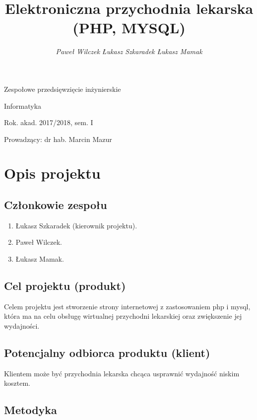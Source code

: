 \documentclass[a4paper]{article} \usepackage{polski} \usepackage[cp1250]{inputenc} \usepackage{url}
\title{\bf{Elektroniczna przychodnia lekarska (PHP, MYSQL)}} \author{{\em Paweł Wilczek }{\em Łukasz Szkaradek } {\em Łukasz Mamak}} \date{}
\begin{document}
\begin{titlepage} \maketitle \thispagestyle{empty} \bigskip \begin{center} Zespołowe przedsięwzięcie inżynierskie

Informatyka

Rok. akad. 2017/2018, sem. I

Prowadzący: dr hab. Marcin Mazur \end{center} \end{titlepage}

\tableofcontents \thispagestyle{empty}


\newpage

\section{Opis projektu}


\subsection{Członkowie zespołu}

\begin{enumerate} \item Łukasz Szkaradek (kierownik projektu). \item Paweł Wilczek. \item Łukasz Mamak. \end{enumerate}

\subsection{Cel projektu (produkt)}


Celem projektu jest stworzenie strony internetowej z zastosowaniem php i mysql, która ma na celu obsługę wirtualnej przychodni lekarskiej oraz zwiększenie jej wydajności.

\subsection{Potencjalny odbiorca produktu (klient)}


Klientem może być przychodnia lekarska chcąca usprawnić wydajność niskim kosztem.

\subsection{Metodyka}
\end{document}
